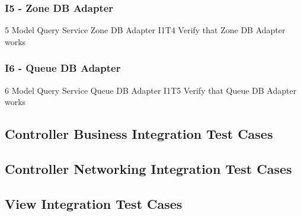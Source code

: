 \subsubsection{I5 - Zone DB Adapter}
\testCaseSimple
	{5}
	{Model Query Service}
	{Zone DB Adapter}
	{I1T4}
	{Verify that Zone DB Adapter works}
\subsubsection{I6 - Queue DB Adapter}
\testCaseSimple
	{6}
	{Model Query Service}
	{Queue DB Adapter}
	{I1T5}
	{Verify that Queue DB Adapter works}
\subsection{Controller Business Integration Test Cases}
\subsection{Controller Networking Integration Test Cases}
\subsection{View Integration Test Cases}